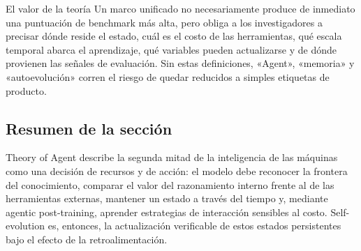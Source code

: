 
\begin{knowledgebox}{El valor de la teoría}
Un marco unificado no necesariamente produce de inmediato una puntuación de benchmark más alta, pero obliga a los investigadores a precisar dónde reside el estado, cuál es el costo de las herramientas, qué escala temporal abarca el aprendizaje, qué variables pueden actualizarse y de dónde provienen las señales de evaluación. Sin estas definiciones, «Agent», «memoria» y «autoevolución» corren el riesgo de quedar reducidos a simples etiquetas de producto.
\end{knowledgebox}

\subsection{Resumen de la sección}

Theory of Agent describe la segunda mitad de la inteligencia de las máquinas como una decisión de recursos y de acción: el modelo debe reconocer la frontera del conocimiento, comparar el valor del razonamiento interno frente al de las herramientas externas, mantener un estado a través del tiempo y, mediante agentic post-training, aprender estrategias de interacción sensibles al costo. Self-evolution es, entonces, la actualización verificable de estos estados persistentes bajo el efecto de la retroalimentación.
